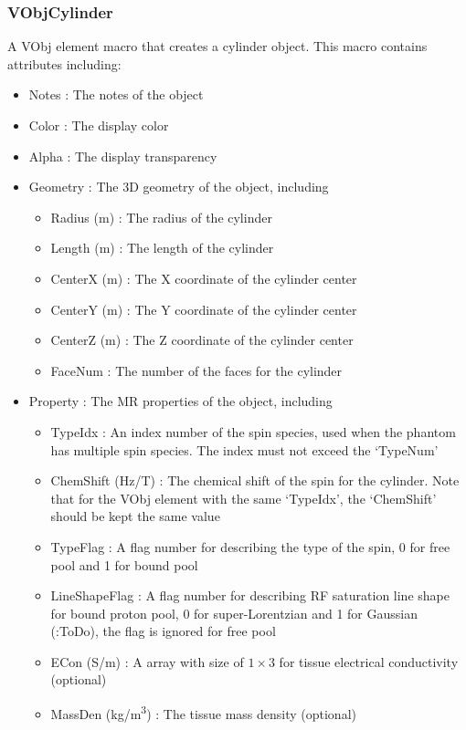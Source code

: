 \documentclass{book}%
\begin{document}
\subsubsection{VObjCylinder}

A VObj element macro that creates a cylinder object. This macro contains attributes including:

\begin{itemize}
	\item Notes : The notes of the object
	\item Color : The display color
	\item Alpha : The display transparency
	\item Geometry : The 3D geometry of the object, including
	\begin{itemize}
		\item Radius (m) : The radius of the cylinder
		\item Length (m) : The length of the cylinder
		\item CenterX (m) : The X coordinate of the cylinder center
		\item CenterY (m) : The Y coordinate of the cylinder center
		\item CenterZ (m) : The Z coordinate of the cylinder center
		\item FaceNum : The number of the faces for the cylinder
	\end{itemize}
	\item Property : The MR properties of the object, including
	\begin{itemize}
		\item TypeIdx : An index number of the spin species, used when the phantom has multiple spin species. The index must not exceed the `TypeNum'
		\item ChemShift (Hz/T) : The chemical shift of the spin for the cylinder. Note that for the VObj element with the same `TypeIdx', the `ChemShift' should be kept the same value
		\item TypeFlag : A flag number for describing the type of the spin, 0 for free pool and 1 for bound pool
		\item LineShapeFlag : A flag number for describing RF saturation line shape for bound proton pool, 0 for super-Lorentzian and 1 for Gaussian (:ToDo), the flag is ignored for free pool
		\item ECon (S/m) : A array with size of $1 \times 3 $ for tissue electrical conductivity (optional)
		\item MassDen (kg/m\textsuperscript{3}) : The tissue mass density (optional)

\end{itemize}
\end{itemize}
\end{document}
